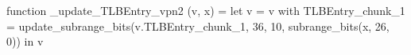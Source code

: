 function _update_TLBEntry_vpn2 (v, x) = let v = { v with TLBEntry_chunk_1 = update_subrange_bits(v.TLBEntry_chunk_1, 36, 10, subrange_bits(x, 26, 0)) } in
  v
